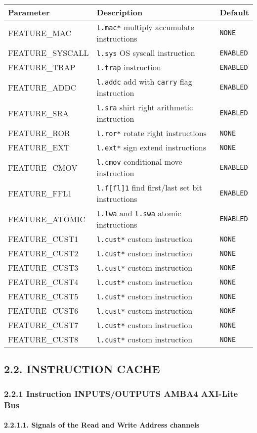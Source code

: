\documentclass[]{article}
\let\oldparagraph\paragraph
\renewcommand{\paragraph}[1]{\oldparagraph{#1}\mbox{}}
\begin{document}
\begin{longtable}[]{@{}lll@{}}
\toprule
Parameter & Description & Default\tabularnewline
\midrule
\endhead
FEATURE\_MAC & \texttt{l.mac*} multiply accumulate instructions &
\texttt{NONE}\tabularnewline
FEATURE\_SYSCALL & \texttt{l.sys} OS syscall instruction &
\texttt{ENABLED}\tabularnewline
FEATURE\_TRAP & \texttt{l.trap} instruction &
\texttt{ENABLED}\tabularnewline
FEATURE\_ADDC & \texttt{l.addc} add with \texttt{carry} flag instruction
& \texttt{ENABLED}\tabularnewline
FEATURE\_SRA & \texttt{l.sra} shirt right arithmetic instruction &
\texttt{ENABLED}\tabularnewline
FEATURE\_ROR & \texttt{l.ror*} rotate right instructions &
\texttt{NONE}\tabularnewline
FEATURE\_EXT & \texttt{l.ext*} sign extend instructions &
\texttt{NONE}\tabularnewline
FEATURE\_CMOV & \texttt{l.cmov} conditional move instruction &
\texttt{ENABLED}\tabularnewline
FEATURE\_FFL1 & \texttt{l.f{[}fl{]}1} find first/last set bit
instructions & \texttt{ENABLED}\tabularnewline
FEATURE\_ATOMIC & \texttt{l.lwa} and \texttt{l.swa} atomic instructions
& \texttt{ENABLED}\tabularnewline
FEATURE\_CUST1 & \texttt{l.cust*} custom instruction &
\texttt{NONE}\tabularnewline
FEATURE\_CUST2 & \texttt{l.cust*} custom instruction &
\texttt{NONE}\tabularnewline
FEATURE\_CUST3 & \texttt{l.cust*} custom instruction &
\texttt{NONE}\tabularnewline
FEATURE\_CUST4 & \texttt{l.cust*} custom instruction &
\texttt{NONE}\tabularnewline
FEATURE\_CUST5 & \texttt{l.cust*} custom instruction &
\texttt{NONE}\tabularnewline
FEATURE\_CUST6 & \texttt{l.cust*} custom instruction &
\texttt{NONE}\tabularnewline
FEATURE\_CUST7 & \texttt{l.cust*} custom instruction &
\texttt{NONE}\tabularnewline
FEATURE\_CUST8 & \texttt{l.cust*} custom instruction &
\texttt{NONE}\tabularnewline
\bottomrule
\end{longtable}

\subsection{2.2. INSTRUCTION CACHE}\label{instruction-cache}

\subsubsection{2.2.1 Instruction INPUTS/OUTPUTS AMBA4 AXI-Lite
Bus}\label{instruction-inputsoutputs-amba4-axi-lite-bus}

\paragraph{2.2.1.1. Signals of the Read and Write Address
channels}\label{signals-of-the-read-and-write-address-channels}
\end{document}
